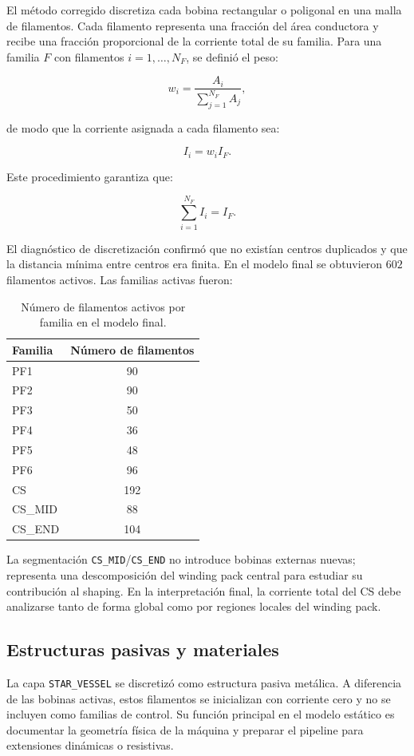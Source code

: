 \documentclass[11pt,a4paper]{article}
\begin{document}
El método corregido discretiza cada bobina rectangular o poligonal en una malla de filamentos.
Cada filamento representa una fracción del área conductora y recibe una fracción proporcional
de la corriente total de su familia. Para una familia $F$ con filamentos $i=1,\ldots,N_F$, se
definió el peso:

\[
w_i = \frac{A_i}{\sum_{j=1}^{N_F} A_j},
\]

de modo que la corriente asignada a cada filamento sea:

\[
I_i = w_i I_F.
\]

Este procedimiento garantiza que:

\[
\sum_{i=1}^{N_F} I_i = I_F.
\]

El diagnóstico de discretización confirmó que no existían centros duplicados y que la distancia
mínima entre centros era finita. En el modelo final se obtuvieron $602$ filamentos activos.
Las familias activas fueron:

\begin{table}[htbp]
\centering
\caption{Número de filamentos activos por familia en el modelo final.}
\label{tab:active_filaments_by_family}
\begin{tabular}{lc}
\toprule
\textbf{Familia} & \textbf{Número de filamentos} \\
\midrule
PF1 & 90 \\
PF2 & 90 \\
PF3 & 50 \\
PF4 & 36 \\
PF5 & 48 \\
PF6 & 96 \\
CS & 192 \\
CS\_MID & 88 \\
CS\_END & 104 \\
\bottomrule
\end{tabular}
\end{table}

La segmentación \texttt{CS\_MID}/\texttt{CS\_END} no introduce bobinas externas nuevas; representa
una descomposición del winding pack central para estudiar su contribución al shaping. En la
interpretación final, la corriente total del CS debe analizarse tanto de forma global como por
regiones locales del winding pack.

\subsection{Estructuras pasivas y materiales}
La capa \texttt{STAR\_VESSEL} se discretizó como estructura pasiva metálica. A diferencia de las
bobinas activas, estos filamentos se inicializan con corriente cero y no se incluyen como
familias de control. Su función principal en el modelo estático es documentar la geometría
física de la máquina y preparar el pipeline para extensiones dinámicas o resistivas.
\end{document}
